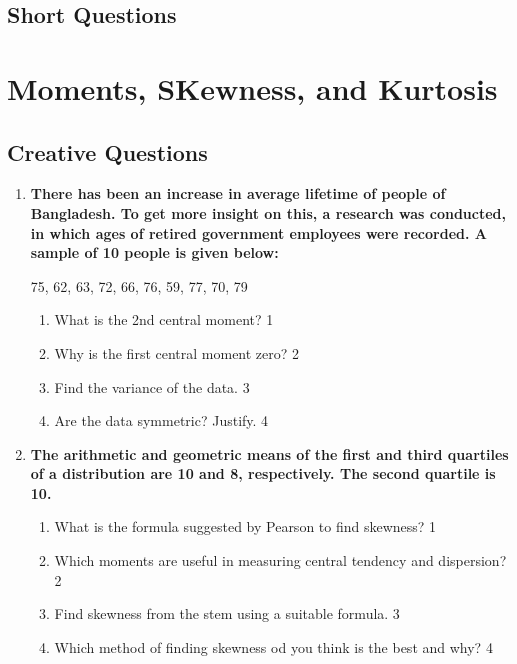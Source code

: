 \documentclass[a4paper,oneside]{book}
\begin{document}
\section{Short Questions}

\chapter{Moments, SKewness, and Kurtosis} 
\section{Creative Questions}

  \begin{enumerate}

   \item
	  \textbf{There has been an increase in average lifetime of people of Bangladesh. To get more insight on this, a research was conducted, in which ages of retired government employees were recorded. A sample of 10 people is given below:}
	  
	  \begin{center}
	  75, 62, 63, 72, 66, 76, 59, 77, 70, 79
	  \end{center}
    \begin{enumerate}
    \item
	What is the 2nd central moment? \hfill 1
    \item
	Why is the first central moment zero? \hfill 2
    \item  
	Find the variance of the data. \hfill 3
    \item
	Are the data symmetric? Justify. \hfill 4
  \end{enumerate}
  
   \item
	  \textbf{The arithmetic and geometric means of the first and third quartiles of a distribution are 10 and 8, respectively. The second quartile is 10.} 
  
  \begin{enumerate}
    \item
	What is the formula suggested by Pearson to find skewness? \hfill 1
    \item
	Which moments are useful in measuring central tendency and dispersion?  \hfill 2
    \item  
	Find skewness from the stem using a suitable formula. \hfill 3
    \item
	Which method of finding skewness od you think is the best and why? \hfill 4
\end{enumerate}


\end{enumerate}
\end{document}
